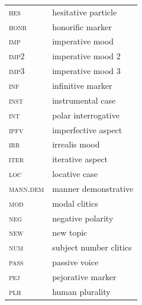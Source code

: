 \documentclass[output=paper,colorlinks,citecolor=brown]{langscibook}
\begin{document}
\begin{tabularx}{.45\textwidth}{@{}lQ}
\textsc{hes}     & hesitative particle \\
\textsc{honr}    & honorific marker \\
\textsc{imp}     & imperative mood \\
\textsc{imp2}    & imperative mood 2 \\
\textsc{imp3}    & imperative mood 3 \\
\textsc{inf}     & infinitive marker \\
\textsc{inst}    & instrumental case \\
\textsc{int}     & polar interrogative \\
\textsc{ipfv}    & imperfective aspect \\
\textsc{irr}     & irrealis mood \\
\textsc{iter}    & iterative aspect \\
\textsc{loc}     & locative case \\
\textsc{mann.dem} & {manner demonstrative} \\
\textsc{mod}     & modal clitics \\
\textsc{neg}     & negative polarity \\
\textsc{new}     & new topic \\
\textsc{num}     & subject number clitics \\
\textsc{pass}    & passive voice \\
\textsc{pej}     & pejorative marker \\
\textsc{plh}     & human plurality   \\\end{tabularx}
\end{document}
